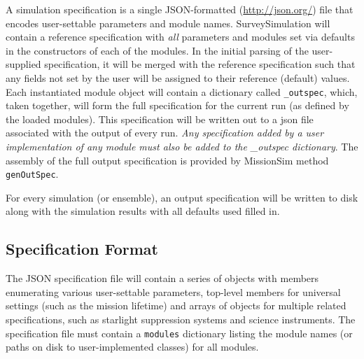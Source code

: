 \documentclass[cleanfoot]{asme2ej}
\begin{document}
A simulation specification is a single JSON-formatted (\url{http://json.org/}) file that encodes user-settable parameters and module names.  SurveySimulation will contain a reference specification with \emph{all} parameters and modules set via defaults in the constructors of each of the modules.  In the initial parsing of the user-supplied specification, it will be merged with the reference specification such that any fields not set by the user will be assigned to their reference (default) values.   Each instantiated module object will contain a dictionary called \verb+_outspec+, which, taken together, will form the full specification for the current run (as defined by the loaded modules).  This specification will be written out to a json file associated with the output of every run.  \emph{Any specification added by a user implementation of any module must also be added to the \_outspec dictionary}.  The assembly of the full output specification is provided by MissionSim method \verb+genOutSpec+.


For every simulation (or ensemble), an output specification will be written to disk along with the simulation results with all defaults used filled in.


\subsection{Specification Format}\label{sec:inputspec}
The JSON specification file will contain a series of objects with members enumerating various user-settable parameters, top-level members for universal settings (such as the mission lifetime) and arrays of objects for multiple related specifications, such as starlight suppression systems and science instruments.  The specification file must contain a \verb+modules+ dictionary listing the module names (or paths on disk to user-implemented classes) for all modules.
\end{document}
